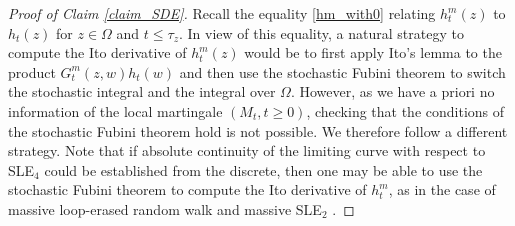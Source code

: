 \documentclass{article}
\theoremstyle{definition}
\theoremstyle{remark}
\theoremstyle{remark}
\begin{document}
\begin{proof}[Proof of Claim \ref{claim_SDE}]
Recall the equality \eqref{hm_with0} relating $h_t^m(z)$ to $h_t(z)$ for $z \in \Omega$ and $t \leq \tau_z$. In view of this equality, a natural strategy to compute the Ito derivative of $h_t^m(z)$ would be to first apply Ito's lemma to the product $G_t^m(z,w)h_t(w)$ and then use the stochastic Fubini theorem to switch the stochastic integral and the integral over $\Omega$. However, as we have a priori no information of the local martingale $(M_t, t \geq 0)$, checking that the conditions of the stochastic Fubini theorem hold is not possible. We therefore follow a different strategy. Note that if absolute continuity of the limiting curve with respect to SLE$_4$ could be established from the discrete, then one may be able to use the stochastic Fubini theorem to compute the Ito derivative of $h_t^m$, as in the case of massive loop-erased random walk and massive SLE$_2$ \cite{mLERW}.


\end{proof}
\end{document}
